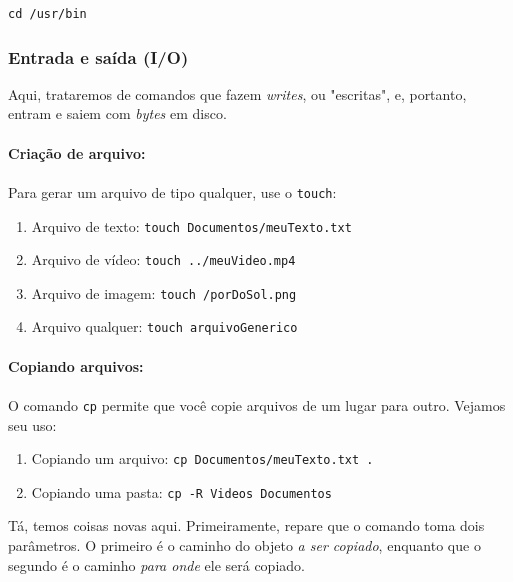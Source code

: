 \documentclass{article}
\begin{document}
	\vspace{1ex}
	\texttt{cd /usr/bin} 
	\vspace{1ex}

	\subsubsection{Entrada e saída (I/O)}

	Aqui, trataremos de comandos que fazem \textit{writes}, ou "escritas", e, portanto, entram e saiem com \textit{bytes} em disco. 

	\paragraph{Criação de arquivo:} 
	\paragraph{}
	Para gerar um arquivo de tipo qualquer, use o \texttt{touch}: 
	
	\begin{enumerate} 
		\item{Arquivo de texto: \texttt{touch Documentos/meuTexto.txt}} 
		\item{Arquivo de vídeo: \texttt{touch ../meuVideo.mp4}}
		\item{Arquivo de imagem: \texttt{touch /porDoSol.png}}
		\item{Arquivo qualquer: \texttt{touch arquivoGenerico}}
	\end{enumerate}

	\paragraph{Copiando arquivos:} 
	\paragraph{} 
	O comando \texttt{cp} permite que você copie arquivos de um lugar para outro. Vejamos seu uso: 
	\begin{enumerate} 
		\item{Copiando um arquivo: \texttt{cp Documentos/meuTexto.txt .}}
		\item{Copiando uma pasta: \texttt{cp -R Videos Documentos}}
	\end{enumerate} 


	Tá, temos coisas novas aqui. Primeiramente, repare que o comando toma dois parâmetros. O primeiro é 
	o caminho do objeto \textit{a ser copiado}, enquanto que o segundo é o caminho \textit{para onde} ele será copiado. 
	
\end{document}
